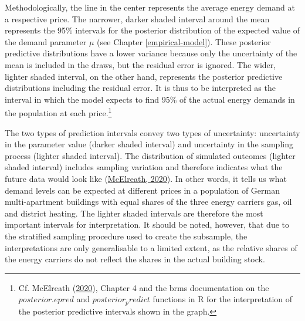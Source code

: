 \documentclass[12pt,twoside]{reedthesis}
\begin{document}
Methodologically, the line in the center represents the average energy demand at a respective price. The narrower, darker shaded interval around the mean represents the 95\% intervals for the posterior distribution of the expected value of the demand parameter \(\mu\) (see Chapter \ref{empirical-model}). These posterior predictive distributions have a lower variance because only the uncertainty of the mean is included in the draws, but the residual error is ignored. The wider, lighter shaded interval, on the other hand, represents the posterior predictive distributions including the residual error. It is thus to be interpreted as the interval in which the model expects to find 95\% of the actual energy demands in the population at each price.\footnote{Cf. McElreath (\protect\hyperlink{ref-mcelreath20}{2020}), Chapter 4 and the brms documentation on the \(posterior.epred\) and \(posterior_predict\) functions in R for the interpretation of the posterior predictive intervals shown in the graph.}

The two types of prediction intervals convey two types of uncertainty: uncertainty in the parameter value (darker shaded interval) and uncertainty in the sampling process (lighter shaded interval). The distribution of simulated outcomes (lighter shaded interval) includes sampling variation and therefore indicates what the future data would look like (\protect\hyperlink{ref-mcelreath20}{McElreath, 2020}). In other words, it tells us what demand levels can be expected at different prices in a population of German multi-apartment buildings with equal shares of the three energy carriers gas, oil and district heating. The lighter shaded intervals are therefore the most important intervals for interpretation. It should be noted, however, that due to the stratified sampling procedure used to create the subsample, the interpretations are only generalisable to a limited extent, as the relative shares of the energy carriers do not reflect the shares in the actual building stock.
\end{document}
